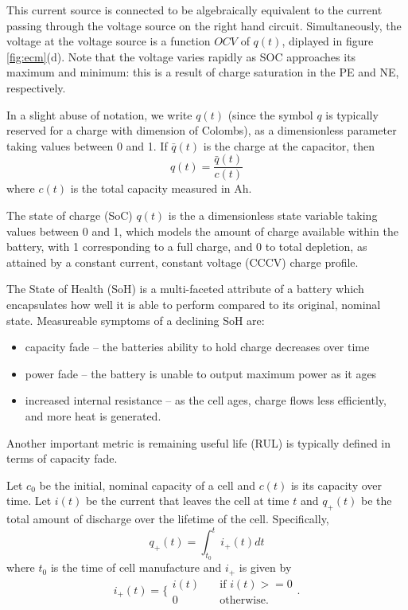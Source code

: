 \documentclass[conference]{IEEEtran}
\begin{document}
 This current source is connected to be algebraically
equivalent to the current passing through the voltage source on the right
hand circuit. Simultaneously, the voltage at the voltage source is a
function $OCV$ of $q(t)$, diplayed in figure \ref{fig:ecm}(d). Note that the voltage
varies rapidly as SOC approaches its maximum and minimum: this is 
a result of charge saturation in the PE and NE, respectively.

In a slight abuse of notation, we write $q(t)$ (since the symbol $q$
is typically reserved for a charge with dimension of Colombs),
as a dimensionless
parameter taking values between 0 and 1. If $\bar{q}(t)$ is the charge
at the capacitor, then
\begin{equation*}
    q(t) = \frac{\bar{q}(t)}{c(t)}
\end{equation*}
where $c(t)$ is the total capacity measured in Ah.




The state of charge (SoC) $q(t)$ is the a dimensionless
state variable taking values between 0 and 1, which models the amount of charge
available within the battery, with 1 corresponding to a full charge, and
0 to total depletion, as attained by a constant current, constant voltage (CCCV)
charge profile.

The State of Health (SoH) is a multi-faceted attribute of a battery which encapsulates
how well it is able to perform compared to its original, nominal state.
Measureable symptoms of a declining SoH are:
\begin{itemize}
    \item capacity fade -- the batteries ability to hold charge decreases over time
    \item power fade -- the battery is unable to output maximum power as it ages
    \item increased internal resistance -- as the cell ages, charge flows less efficiently,
        and more heat is generated.
\end{itemize}


Another important metric is remaining useful life (RUL) is typically
defined in terms of capacity fade.

Let $c_0$ be the initial, nominal
capacity of a cell and $c(t)$ is its capacity over time.
Let $i(t)$ be the current that leaves the cell at time $t$
and $q_+(t)$ be the total amount of discharge over the lifetime of
the cell. Specifically,
\begin{equation*}
    q_+(t) = \int_{t_0}^{t} i_+(t) dt
\end{equation*}
where $t_0$ is the time of cell manufacture and $i_+$ is given by
\begin{equation*}
    i_+(t) = \biggl\{
        \begin{array}{ll}
            i(t) &\quad \text{if } i(t) >= 0 \\
            0 & \quad \text{otherwise.}
        \end{array}
    \biggr.
\end{equation*}
\end{document}
